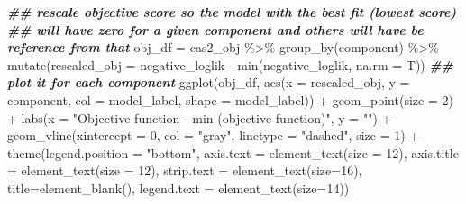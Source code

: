 \documentclass[
]{book}
\newenvironment{Shaded}{\begin{snugshade}}{\end{snugshade}}
\newcommand{\AttributeTok}[1]{\textcolor[rgb]{0.77,0.63,0.00}{#1}}
\newcommand{\DecValTok}[1]{\textcolor[rgb]{0.00,0.00,0.81}{#1}}
\newcommand{\DocumentationTok}[1]{\textcolor[rgb]{0.56,0.35,0.01}{\textbf{\textit{#1}}}}
\newcommand{\FunctionTok}[1]{\textcolor[rgb]{0.00,0.00,0.00}{#1}}
\newcommand{\NormalTok}[1]{#1}
\newcommand{\OtherTok}[1]{\textcolor[rgb]{0.56,0.35,0.01}{#1}}
\newcommand{\SpecialCharTok}[1]{\textcolor[rgb]{0.00,0.00,0.00}{#1}}
\newcommand{\StringTok}[1]{\textcolor[rgb]{0.31,0.60,0.02}{#1}}
\begin{document}
\begin{Shaded}
\begin{Highlighting}[]
\DocumentationTok{\#\# rescale objective score so the model with the best fit (lowest score)}
\DocumentationTok{\#\# will have zero for a given component and others will have be reference from that}
\NormalTok{obj\_df }\OtherTok{=}\NormalTok{ cas2\_obj }\SpecialCharTok{\%\textgreater{}\%} \FunctionTok{group\_by}\NormalTok{(component) }\SpecialCharTok{\%\textgreater{}\%} 
  \FunctionTok{mutate}\NormalTok{(}\AttributeTok{rescaled\_obj =}\NormalTok{ negative\_loglik }\SpecialCharTok{{-}} \FunctionTok{min}\NormalTok{(negative\_loglik, }\AttributeTok{na.rm =}\NormalTok{ T))}
\DocumentationTok{\#\# plot it for each component}
\FunctionTok{ggplot}\NormalTok{(obj\_df, }\FunctionTok{aes}\NormalTok{(}\AttributeTok{x =}\NormalTok{ rescaled\_obj, }\AttributeTok{y =}\NormalTok{ component, }\AttributeTok{col =}\NormalTok{ model\_label, }\AttributeTok{shape =}\NormalTok{ model\_label)) }\SpecialCharTok{+}
  \FunctionTok{geom\_point}\NormalTok{(}\AttributeTok{size =} \DecValTok{2}\NormalTok{) }\SpecialCharTok{+}
  \FunctionTok{labs}\NormalTok{(}\AttributeTok{x =} \StringTok{"Objective function {-} min (objective function)"}\NormalTok{, }\AttributeTok{y =} \StringTok{""}\NormalTok{) }\SpecialCharTok{+}
  \FunctionTok{geom\_vline}\NormalTok{(}\AttributeTok{xintercept =} \DecValTok{0}\NormalTok{, }\AttributeTok{col =} \StringTok{"gray"}\NormalTok{, }\AttributeTok{linetype =} \StringTok{"dashed"}\NormalTok{, }\AttributeTok{size =} \DecValTok{1}\NormalTok{) }\SpecialCharTok{+}
  \FunctionTok{theme}\NormalTok{(}\AttributeTok{legend.position =} \StringTok{"bottom"}\NormalTok{, }
        \AttributeTok{axis.text =} \FunctionTok{element\_text}\NormalTok{(}\AttributeTok{size =} \DecValTok{12}\NormalTok{), }
        \AttributeTok{axis.title =} \FunctionTok{element\_text}\NormalTok{(}\AttributeTok{size =} \DecValTok{12}\NormalTok{),}
        \AttributeTok{strip.text =} \FunctionTok{element\_text}\NormalTok{(}\AttributeTok{size=}\DecValTok{16}\NormalTok{),}
        \AttributeTok{title=}\FunctionTok{element\_blank}\NormalTok{(),}
        \AttributeTok{legend.text =} \FunctionTok{element\_text}\NormalTok{(}\AttributeTok{size=}\DecValTok{14}\NormalTok{))}
\end{Highlighting}
\end{Shaded}
\end{document}
